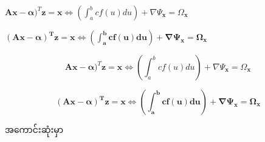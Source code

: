 \(\bm{A}\bm{x} - \bm{\alpha})^T\bm{z} = \bm{x} \iff \left( \int_{a}^{b}cf(u)du \right) + \nabla \Psi_{\bm{x}} = \Omega_{\bm{x}}\)

\(\bm{(Ax - \alpha)^Tz = x \iff \left( \int_{a}^{b}cf(u)du \right) + \nabla \Psi_x = \Omega_x}\)


\[\bm{A}\bm{x} - \bm{\alpha})^T\bm{z} = \bm{x} \iff \left( \int_{a}^{b}cf(u)du \right) + \nabla \Psi_{\bm{x}} = \Omega_{\bm{x}}\]

\[\bm{(Ax - \alpha)^Tz = x \iff \left( \int_{a}^{b}cf(u)du \right) + \nabla \Psi_x = \Omega_x}\]

အကောင်းဆုံးမှာ